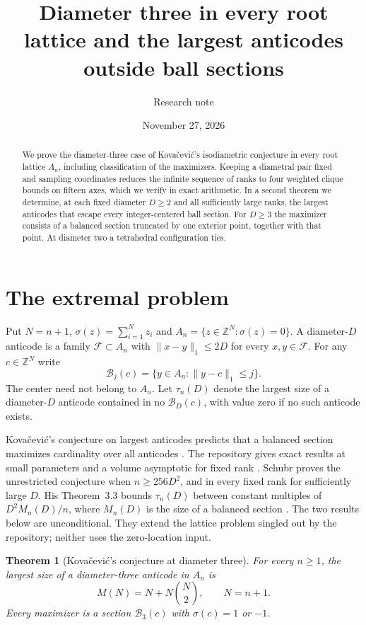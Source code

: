 \documentclass[10pt]{article}
\title{Diameter three in every root lattice and the largest anticodes outside ball sections}
\author{Research note}
\date{November 27, 2026}
\newtheorem{theorem}{Theorem}
\newcommand{\Z}{\mathbb Z}
\newcommand{\F}{\mathcal F}
\newcommand{\s}{\sigma}
\newcommand{\B}{\mathcal B}
\newcommand{\norm}[1]{\lVert #1\rVert_1}
\begin{document}
\maketitle
\begin{abstract}
We prove the diameter-three case of Kova\v cevi\'c's isodiametric conjecture in every root lattice $A_n$, including classification of the maximizers. Keeping a diametral pair fixed and sampling coordinates reduces the infinite sequence of ranks to four weighted clique bounds on fifteen axes, which we verify in exact arithmetic. In a second theorem we determine, at each fixed diameter $D\ge2$ and all sufficiently large ranks, the largest anticodes that escape every integer-centered ball section. For $D\ge3$ the maximizer consists of a balanced section truncated by one exterior point, together with that point. At diameter two a tetrahedral configuration ties.
\end{abstract}

\section{The extremal problem}

Put $N=n+1$, $\s(z)=\sum_{i=1}^N z_i$ and $A_n=\{z\in\Z^N:\s(z)=0\}$. A diameter-$D$ anticode is a family $\F\subset A_n$ with $\norm{x-y}\le2D$ for every $x,y\in\F$. For any $c\in\Z^N$ write
\[
  \B_j(c)=\{y\in A_n:\norm{y-c}\le j\}.
\]
The center need not belong to $A_n$. Let $\tau_n(D)$ denote the largest size of a diameter-$D$ anticode contained in no $\B_D(c)$, with value zero if no such anticode exists.

Kova\v cevi\'c's conjecture on largest anticodes predicts that a balanced section maximizes cardinality over all anticodes \cite{kov}. The repository gives exact results at small parameters and a volume asymptotic for fixed rank \cite{repo}. Schubr proves the unrestricted conjecture when $n\ge256D^2$, and in every fixed rank for sufficiently large $D$. His Theorem~3.3 bounds $\tau_n(D)$ between constant multiples of $D^2 M_n(D)/n$, where $M_n(D)$ is the size of a balanced section \cite{schubr}. The two results below are unconditional. They extend the lattice problem singled out by the repository; neither uses the zero-location input.

\begin{theorem}[Kova\v cevi\'c's conjecture at diameter three]\label{diam3}
For every $n\ge1$, the largest size of a diameter-three anticode in $A_n$ is
\[
                      M(N)=N+N\binom N2,\qquad N=n+1.
\]
Every maximizer is a section $\B_3(c)$ with $\s(c)=1$ or $-1$.
\end{theorem}
\end{document}
